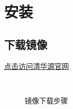\setcounter{page}{1} %
\chapter{安装}
\section{下载镜像} 
\href{https://mirrors.tuna.tsinghua.edu.cn/}{点击访问清华源官网}



\begin{figure}[h!]
	\\
	\caption{镜像下载步骤}
\end{figure}

  
